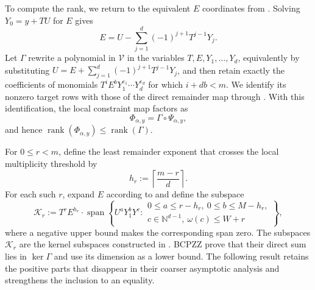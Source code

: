 \documentclass[11pt,letterpaper]{article}
\theoremstyle{definition}
\newcommand{\N}{\mathbb{N}}
\newcommand{\rank}{\operatorname{rank}}
\begin{document}
To compute the rank, we return to the equivalent $E$ coordinates from
. Solving $Y_0=y+TU$ for $E$ gives
\begin{equation}
  E=U-\sum_{j=1}^{d}(-1)^{j+1}T^{j-1}Y_j.
  \label{eq:e-in-u}
\end{equation}
Let \(\Gamma\) rewrite a polynomial in \(\mathcal V\) in the variables
\(T,E,Y_1,\ldots,Y_d\), equivalently by substituting
\(U=E+\sum_{j=1}^{d}(-1)^{j+1}T^{j-1}Y_j\), and then retain exactly the
coefficients of monomials
\(T^iE^bY_1^{e_1}\cdots Y_d^{e_d}\) for which \(i+db<m\).
We identify its nonzero target rows with those of the direct remainder map
through . With this identification, the local
constraint map factors as
\begin{equation}
  \Phi_{\alpha,y}=\Gamma\circ\Psi_{\alpha,y},
  \label{eq:local-map-factorization}
\end{equation}
and hence \(\rank(\Phi_{\alpha,y})\leq\rank(\Gamma)\).

For \(0\leq r<m\), define the least remainder exponent that crosses the local
multiplicity threshold by
\begin{equation}
  h_r:=\left\lceil\frac{m-r}{d}\right\rceil.
  \label{eq:hr-definition}
\end{equation}
For each such \(r\), expand \(E\) according to  and define
the subspace
\begin{equation}
  \mathcal K_r
  :=
  T^rE^{h_r}\cdot
  \operatorname{span}\left\{
    U^aY_1^bY^c:
    \begin{array}{l}
      0\leq a\leq r-h_r,\ 0\leq b\leq M-h_r,\\
      c\in\N^{d-1},\ \omega(c)\leq W+r
    \end{array}
  \right\},
  \label{eq:kernel-space-kr}
\end{equation}
where a negative upper bound makes the corresponding span zero.
The subspaces \(\mathcal K_r\) are the kernel subspaces constructed in
\cite[Lemma~3.11]{BCPZZ26}. BCPZZ prove that their direct sum lies in
\(\ker\Gamma\) and use its dimension as a lower bound. The following result
retains the positive parts that disappear in their coarser asymptotic analysis
and strengthens the inclusion to an equality.
\end{document}
